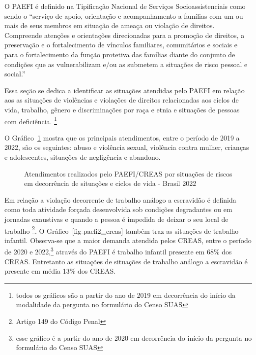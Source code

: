 \documentclass[
  letterpaper,
  DIV=11,
  numbers=noendperiod]{scrreprt}
\begin{document}
O PAEFI é definido na Tipificação Nacional de Serviços
Socioassistenciais como sendo o ``serviço de apoio, orientação e
acompanhamento a famílias com um ou mais de seus membros em situação de
ameaça ou violação de direitos. Compreende atenções e orientações
direcionadas para a promoção de direitos, a preservação e o
fortalecimento de vínculos familiares, comunitários e sociais e para o
fortalecimento da função protetiva das famílias diante do conjunto de
condições que as vulnerabilizam e/ou as submetem a situações de risco
pessoal e social.''

Essa seção se dedica a identificar as situações atendidas pelo PAEFI em
relação aos as situações de violências e violações de direitos
relacionadas aos ciclos de vida, trabalho, gênero e discriminações por
raça e etnia e situações de pessoas com deficiência. \footnote{todos os
  gráficos são a partir do ano de 2019 em decorrência do início da
  modalidade da pergunta no formulário do Censo SUAS}

O Gráfico~\ref{fig-paefi_creas} mostra que os principais atendimentos,
entre o período de 2019 a 2022, são os seguintes: abuso e violência
sexual, violência contra mulher, crianças e adolescentes, situações de
negligência e abandono.

\begin{figure}


\caption{\label{fig-paefi_creas}Atendimentos realizados pelo PAEFI/CREAS
por situações de riscos em decorrência de situações e ciclos de vida -
Brasil 2022}

\end{figure}%

Em relação a violação decorrente de trabalho análogo a escravidão é
definida como toda atividade forçada desenvolvida sob condições
degradantes ou em jornadas exaustivas e quando a pessoa é impedida de
deixar o seu local de trabalho \footnote{Artigo 149 do Código Penal}. O
Gráfico~\ref{fig-paefi2_creas} também traz as situações de trabalho
infantil. Observa-se que a maior demanda atendida pelos CREAS, entre o
período de 2020 e 2022,\footnote{esse gráfico é a partir do ano de 2020
  em decorrência do início da pergunta no formulário do Censo SUAS}
através do PAEFI é trabalho infantil presente em 68\% dos CREAS.
Entretanto as situações de situações de trabalho análogo a escravidão é
presente em média 13\% dos CREAS.
\end{document}
